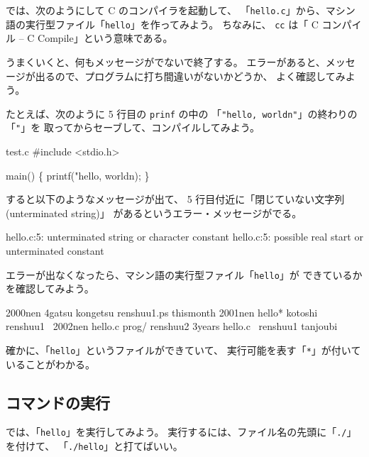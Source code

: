 では、次のようにして C のコンパイラを起動して、
「\texttt{hello.c}」から、マシン語の実行型ファイル「\texttt{hello}」を作ってみよう。
ちなみに、 \texttt{cc} は「 C コンパイル -- C Compile」という意味である。

\begin{progls}
%
\end{progls}

うまくいくと、何もメッセージがでないで終了する。
エラーがあると、メッセージが出るので、プログラムに打ち間違いがないかどうか、
よく確認してみよう。

\bigskip

たとえば、次のように 5 行目の \texttt{prinf} の中の
「\texttt{"hello, world{\bcsl}n"}」の終わりの「\texttt{"}」を
取ってからセーブして、コンパイルしてみよう。

\begin{progls2}{test.c}
#include <stdio.h>

main()
\{
  printf("hello, world{\bcsl}n);
\}
\end{progls2}

すると以下のようなメッセージが出て、
 5 行目付近に「閉じていない文字列(unterminated string)」
があるというエラー・メッセージがでる。 

\begin{progls}
hello.c:5: unterminated string or character constant
hello.c:5: possible real start or unterminated constant
%
\end{progls}


エラーが出なくなったら、マシン語の実行型ファイル「\texttt{hello}」が
できているかを確認してみよう。

\begin{progls}
2000nen         4gatsu          kongetsu        renshuu1.ps     thismonth
2001nen         hello*          kotoshi         renshuu1~
2002nen         hello.c         prog/           renshuu2
3years          hello.c~        renshuu1        tanjoubi
%
\end{progls}

確かに、「\texttt{hello}」というファイルができていて、
実行可能を表す「\texttt{*}」が付いていることがわかる。

\subsection{コマンドの実行}

では、「\texttt{hello}」を実行してみよう。
実行するには、ファイル名の先頭に「\texttt{./}」を付けて、
「\texttt{./hello}」と打てばいい。

